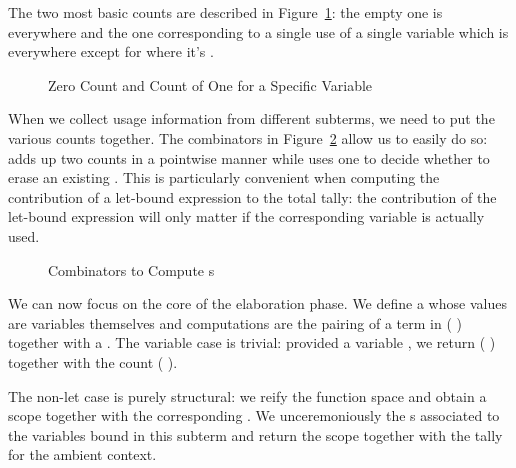 The two most basic counts are described in Figure~\ref{fig:basiccount}: the
empty one is  everywhere and the one corresponding to a single use
of a single variable  which is  everywhere except for 
where it's .

\begin{figure}[h]
\begin{minipage}{0.45\textwidth}
\end{minipage}
\begin{minipage}{0.45\textwidth}
\end{minipage}
\caption{Zero Count and Count of One for a Specific Variable}\label{fig:basiccount}
\end{figure}

When we collect usage information from different subterms, we need to put the
various counts together. The combinators in Figure~\ref{fig:combinatorscount}
allow us to easily do so:  adds up two counts in a pointwise manner
while  uses one  to decide whether to erase an existing
. This is particularly convenient when computing the contribution of
a let-bound expression to the total tally: the contribution of the let-bound
expression will only matter if the corresponding variable is actually used.

\begin{figure}[H]
\begin{minipage}{0.5\textwidth}
\end{minipage}
\begin{minipage}{0.4\textwidth}
\end{minipage}
\caption{Combinators to Compute s}\label{fig:combinatorscount}
\end{figure}

We can now focus on the core of the elaboration phase. We define a
 whose values are variables themselves and computations
are the pairing of a term in {(  )} together with
a . The variable case is trivial: provided a variable ,
we return {( )} together with the count {( )}.

The non-let case is purely structural: we reify the  function
space and obtain a scope together with the corresponding . We
unceremoniously  the s associated to the variables
bound in this subterm and return the scope together with the tally for
the ambient context.

